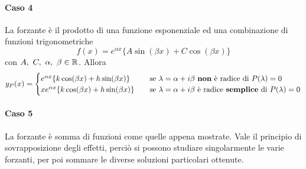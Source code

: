 \paragraph{Caso 4} La forzante è il prodotto di una funzione esponenziale ed una combinazione di funzioni trigonometriche
\begin{equation*}
    f(x)=e^{\alpha x} \{A \sin(\beta x)+ C \cos(\beta x)\}
\end{equation*}
con $A,\ C,\ \alpha,\ \beta \in \mathbb{R}$. Allora
\begin{equation*}
    y_P(x)= \begin{cases}
        e^{\alpha x}\{k \cos(\beta x) + h \sin(\beta x)\} &\quad \text{se}\ \lambda=\alpha+i\beta\ \text{\textbf{non} è radice di}\ P(\lambda)=0\\
        xe^{\alpha x}\{k \cos(\beta x) + h \sin(\beta x)\} &\quad \text{se}\ \lambda=\alpha+i\beta\ \text{è radice \textbf{semplice} di}\ P(\lambda)=0\\ 
    \end{cases}
\end{equation*}
\paragraph{Caso 5} La forzante è somma di funzioni come quelle appena mostrate. Vale il principio di sovrapposizione degli effetti, perciò si possono studiare singolarmente le varie forzanti, per poi sommare le diverse soluzioni particolari ottenute.
